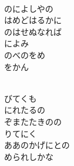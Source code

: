 \documentclass[10pt,b5j]{tarticle} %
\begin{document}
\begin{enumerate}
\begin{minipage}[c]{\blocksize}
    \end{minipage}
    \begin{minipage}[c]{\blocksize}
        
        \vspace{\linespace}
        \item~\\
        のによしやの\\
        はめどはるかに\\
        のはせぬなれば\\
        によみ\\
        のべのをめ\\
        をかん
        
    \end{minipage}
    \begin{minipage}[c]{\blocksize}
        
        \vspace{\linespace}
        \item~\\
        びてくも\\
        にれたるの\\
        ぞまたたきのの\\
        りてにく\\
        ああのかげにとの\\
        められしかな
        
    \end{minipage}
    \begin{minipage}[c]{\blocksize}
        

\end{minipage}
\end{enumerate}
\end{document}
